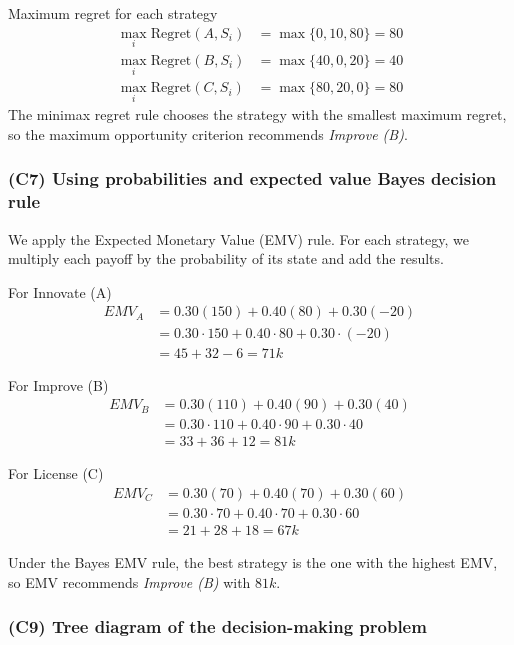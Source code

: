	Maximum regret for each strategy
	\[
	\begin{aligned}
		\max_i \text{Regret}(A, S_i) &= \max\{0, 10, 80\} = 80\\
		\max_i \text{Regret}(B, S_i) &= \max\{40, 0, 20\} = 40\\
		\max_i \text{Regret}(C, S_i) &= \max\{80, 20, 0\} = 80
	\end{aligned}
	\]
	The minimax regret rule chooses the strategy with the smallest maximum regret, so the
	maximum opportunity criterion recommends \emph{Improve (B)}.
	
	\subsubsection{(C7) Using probabilities and expected value Bayes decision rule}\label{example-1-c7}
	
	We apply the Expected Monetary Value (EMV) rule. For each strategy, we multiply each payoff by the probability
	of its state and add the results.
	
	For Innovate (A)
	\[
	\begin{aligned}
		EMV_A &= 0.30(150) + 0.40(80) + 0.30(-20) \\
		&= 0.30\cdot150 + 0.40\cdot80 + 0.30\cdot(-20) \\
		&= 45 + 32 - 6 = 71k
	\end{aligned}
	\]
	
	For Improve (B)
	\[
	\begin{aligned}
		EMV_B &= 0.30(110) + 0.40(90) + 0.30(40) \\
		&= 0.30\cdot110 + 0.40\cdot90 + 0.30\cdot40 \\
		&= 33 + 36 + 12 = 81k
	\end{aligned}
	\]
	
	For License (C)
	\[
	\begin{aligned}
		EMV_C &= 0.30(70) + 0.40(70) + 0.30(60) \\
		&= 0.30\cdot70 + 0.40\cdot70 + 0.30\cdot60 \\
		&= 21 + 28 + 18 = 67k
	\end{aligned}
	\]
	
	Under the Bayes EMV rule, the best strategy is the one with the highest EMV, so EMV recommends
	\emph{Improve (B)} with \(81k\).
	
	\subsubsection{(C9) Tree diagram of the decision-making problem}\label{example-1-c9}
	
